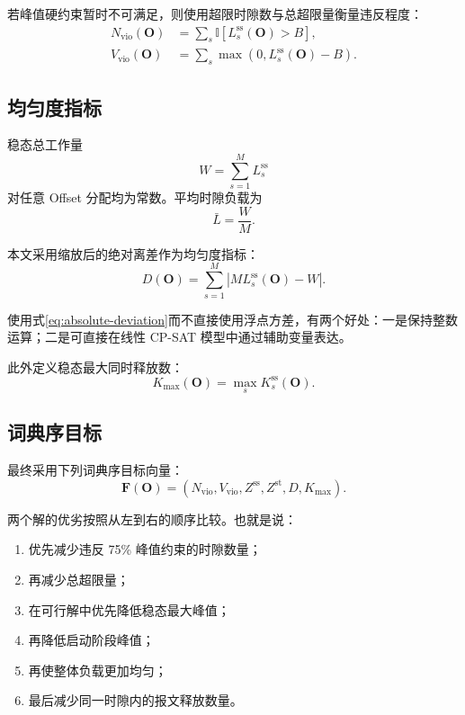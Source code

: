 \documentclass[UTF8,12pt,a4paper]{ctexart}
\newcommand{\ind}{\mathbb{I}}
\begin{document}
若峰值硬约束暂时不可满足，则使用超限时隙数与总超限量衡量违反程度：
\begin{align}
 N_{\mathrm{vio}}(\symbf{O})
 &=\sum_s \ind\!\left[L^{\mathrm{ss}}_s(\symbf{O})>B\right],\\
 V_{\mathrm{vio}}(\symbf{O})
 &=\sum_s \max\left(0,L^{\mathrm{ss}}_s(\symbf{O})-B\right).
\label{eq:violations}
\end{align}

\subsection{均匀度指标}

稳态总工作量
\begin{equation}
 W=\sum_{s=1}^{M}L^{\mathrm{ss}}_s
\end{equation}
对任意 Offset 分配均为常数。平均时隙负载为
\begin{equation}
 \bar L=\frac{W}{M}.
\end{equation}

本文采用缩放后的绝对离差作为均匀度指标：
\begin{equation}
 D(\symbf{O})=
 \sum_{s=1}^{M}\left|M L^{\mathrm{ss}}_s(\symbf{O})-W\right|.
\label{eq:absolute-deviation}
\end{equation}

使用式\eqref{eq:absolute-deviation}而不直接使用浮点方差，有两个好处：一是保持整数运算；二是可直接在线性 CP-SAT 模型中通过辅助变量表达。

此外定义稳态最大同时释放数：
\begin{equation}
 K_{\max}(\symbf{O})=\max_s K^{\mathrm{ss}}_s(\symbf{O}).
\end{equation}

\subsection{词典序目标}

最终采用下列词典序目标向量：
\begin{equation}
 \symbf{F}(\symbf{O})=
 \left(
 N_{\mathrm{vio}},
 V_{\mathrm{vio}},
 Z^{\mathrm{ss}},
 Z^{\mathrm{st}},
 D,
 K_{\max}
 \right).
\label{eq:lexicographic-objective}
\end{equation}

两个解的优劣按照从左到右的顺序比较。也就是说：

\begin{enumerate}
  \item 优先减少违反 75\% 峰值约束的时隙数量；
  \item 再减少总超限量；
  \item 在可行解中优先降低稳态最大峰值；
  \item 再降低启动阶段峰值；
  \item 再使整体负载更加均匀；
  \item 最后减少同一时隙内的报文释放数量。
\end{enumerate}
\end{document}
